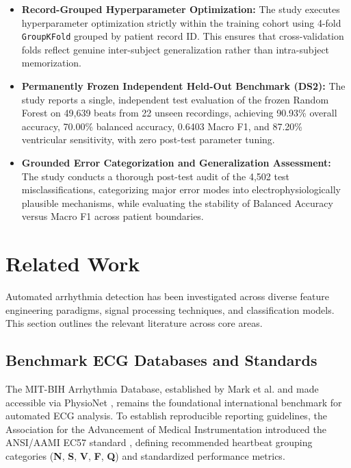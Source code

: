 \documentclass[conference]{IEEEtran}
\begin{document}
\begin{itemize}
    \item \textbf{Record-Grouped Hyperparameter Optimization:} The study executes hyperparameter optimization strictly within the training cohort using 4-fold \texttt{GroupKFold} grouped by patient record ID. This ensures that cross-validation folds reflect genuine inter-subject generalization rather than intra-subject memorization.
    \item \textbf{Permanently Frozen Independent Held-Out Benchmark (DS2):} The study reports a single, independent test evaluation of the frozen Random Forest on 49,639 beats from 22 unseen recordings, achieving 90.93\% overall accuracy, 70.00\% balanced accuracy, 0.6403 Macro F1, and 87.20\% ventricular sensitivity, with zero post-test parameter tuning.
    \item \textbf{Grounded Error Categorization and Generalization Assessment:} The study conducts a thorough post-test audit of the 4,502 test misclassifications, categorizing major error modes into electrophysiologically plausible mechanisms, while evaluating the stability of Balanced Accuracy versus Macro F1 across patient boundaries.
\end{itemize}

\section{Related Work}
Automated arrhythmia detection has been investigated across diverse feature engineering paradigms, signal processing techniques, and classification models. This section outlines the relevant literature across core areas.

\subsection{Benchmark ECG Databases and Standards}
The MIT-BIH Arrhythmia Database, established by Mark et al. \cite{mark1982annotated} and made accessible via PhysioNet \cite{goldberger2000physiobank}, remains the foundational international benchmark for automated ECG analysis. To establish reproducible reporting guidelines, the Association for the Advancement of Medical Instrumentation introduced the ANSI/AAMI EC57 standard \cite{aami1998ec57}, defining recommended heartbeat grouping categories (\textbf{N}, \textbf{S}, \textbf{V}, \textbf{F}, \textbf{Q}) and standardized performance metrics.
\end{document}
